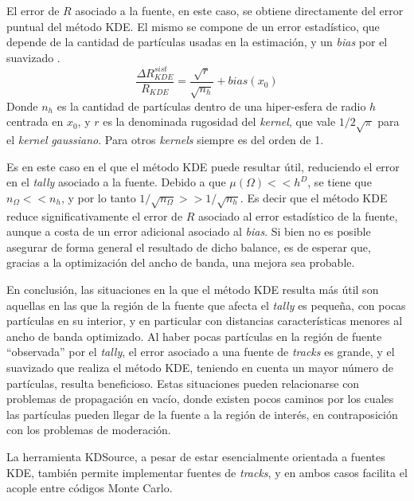 El error de $R$ asociado a la fuente, en este caso, se obtiene directamente del error puntual del método KDE. El mismo se compone de un error estadístico, que depende de la cantidad de partículas usadas en la estimación, y un \emph{bias} por el suavizado \cite{NP}.
\begin{equation}
    \frac{\Delta R_{KDE}^{sist}}{R_{KDE}} = \frac{\sqrt{r}}{\sqrt{n_h}} + bias(x_0)
\end{equation}
Donde $n_h$ es la cantidad de partículas dentro de una hiper-esfera de radio $h$ centrada en $x_0$, y $r$ es la denominada rugosidad del \emph{kernel}, que vale $1/2\sqrt{\pi}$ para el \emph{kernel} \emph{gaussiano}. Para otros \emph{kernels} siempre es del orden de 1.

Es en este caso en el que el método KDE puede resultar útil, reduciendo el error en el \emph{tally} asociado a la fuente. Debido a que $\mu(\Omega) << h^D$, se tiene que $n_{\Omega} << n_h$, y por lo tanto $1/\sqrt{n_{\Omega}} >> 1/\sqrt{n_h}$. Es decir que el método KDE reduce significativamente el error de $R$ asociado al error estadístico de la fuente, aunque a costa de un error adicional asociado al \emph{bias}. Si bien no es posible asegurar de forma general el resultado de dicho balance, es de esperar que, gracias a la optimización del ancho de banda, una mejora sea probable.

En conclusión, las situaciones en la que el método KDE resulta más útil son aquellas en las que la región de la fuente que afecta el \emph{tally} es pequeña, con pocas partículas en su interior, y en particular con distancias características menores al ancho de banda optimizado. Al haber pocas partículas en la región de fuente ``observada'' por el \emph{tally}, el error asociado a una fuente de \emph{tracks} es grande, y el suavizado que realiza el método KDE, teniendo en cuenta un mayor número de partículas, resulta beneficioso. Estas situaciones pueden relacionarse con problemas de propagación en vacío, donde existen pocos caminos por los cuales las partículas pueden llegar de la fuente a la región de interés, en contraposición con los problemas de moderación.

La herramienta KDSource, a pesar de estar esencialmente orientada a fuentes KDE, también permite implementar fuentes de \emph{tracks}, y en ambos casos facilita el acople entre códigos Monte Carlo.
